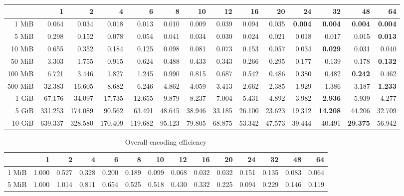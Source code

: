 \begin{centering}
\begin{table}[!h]
\begin{tabular}{rrrrrrrrrrrrrr}
		\diagbox[width=7em]{Size}{Threads}  &      1  &      2  &      4  &      6  &     8  &     10 &     12 &     16 &     20 &     24 &     32 &     48 &     64 \\
		\midrule
		1 MiB   &   0.064 &   0.034 &   0.018 &   0.013 &  0.010 &  0.009 &  0.039 &  0.094 &  0.035 &  \textbf{0.004} &  \textbf{0.004} &  \textbf{0.004} &  \textbf{0.004} \\
		5 MiB   &   0.298 &   0.152 &   0.078 &   0.054 &  0.041 &  0.034 &  0.030 &  0.024 &  0.021 &  0.018 &  0.017 &  0.015 &  \textbf{0.013} \\
		10 MiB  &   0.655 &   0.352 &   0.184 &   0.125 &  0.098 &  0.081 &  0.073 &  0.153 &  0.057 &  0.034 &  \textbf{0.029} &  0.031 &  0.040 \\
		50 MiB  &   3.303 &   1.755 &   0.915 &   0.624 &  0.488 &  0.433 &  0.343 &  0.266 &  0.295 &  0.177 &  0.139 &  0.178 &  \textbf{0.132} \\
		100 MiB &   6.721 &   3.446 &   1.827 &   1.245 &  0.990 &  0.815 &  0.687 &  0.542 &  0.486 &  0.380 &  0.482 &  \textbf{0.242} &  0.462 \\
		500 MiB &  32.383 &  16.605 &   8.682 &   6.246 &  4.862 &  4.059 &  3.413 &  2.662 &  2.385 &  1.929 &  1.386 &  3.187 &  \textbf{1.233} \\
		1 GiB   &  67.176 &  34.097 &  17.735 &  12.655 &  9.879 &  8.237 &  7.004 &  5.431 &  4.892 &  3.982 &  \textbf{2.936} &  5.939 &  4.277 \\
		5 GiB   & 331.253 & 174.089 &  90.562 &  63.491 & 48.645 & 38.946 & 33.185 & 26.100 & 23.623 & 19.312 & \textbf{14.208} & 44.206 & 32.709 \\
		10 GiB  & 639.337 & 328.580 & 170.409 & 119.682 & 95.123 & 79.805 & 68.875 & 53.342 & 47.573 & 39.444 & 40.491 & \textbf{29.375} & 56.942 \\
		\bottomrule
	\end{tabular}
\end{table}
\begin{table}[!h]
	\caption{Overall encoding efficiency}
	\begin{tabular}{rrrrrrrrrrrrrr}
		\toprule
		\diagbox[width=7em]{Size}{Threads} &    1  &    2  &    4  &    6  &    8  &    10 &    12 &    16 &    20 &    24 &    32 &    48 &    64 \\
		\midrule
		1 MiB   & 1.000 & 0.527 & 0.328 & 0.200 & 0.189 & 0.099 & 0.068 & 0.032 & 0.032 & 0.151 & 0.135 & 0.083 & 0.064 \\
		5 MiB   & 1.000 & 1.014 & 0.811 & 0.654 & 0.525 & 0.518 & 0.430 & 0.332 & 0.225 & 0.094 & 0.229 & 0.146 & 0.119 \\

\end{tabular}
\end{table}
\end{centering}
